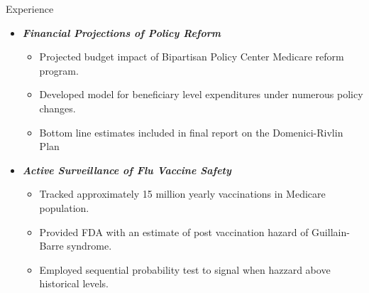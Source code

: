 \documentclass{resume} %
\begin{document}
\begin{rSection}{Experience}
\begin{itemize}
\begin{itemize}
\begin{itemize}
    	\end{itemize}
    	\item {\bf \em Financial Projections of Policy Reform}
        \begin{itemize} \itemsep -0.2em
    		\item Projected budget impact of Bipartisan Policy Center Medicare reform program.
            \item Developed model for beneficiary level expenditures under numerous policy changes.
            \item Bottom line estimates included in final report on the Domenici-Rivlin Plan
    	\end{itemize}
        \item {\bf \em Active Surveillance of Flu Vaccine Safety}
        \begin{itemize} \itemsep -0.2em
        	\item Tracked approximately 15 million yearly vaccinations in Medicare population.
        	\item Provided FDA with an estimate of post vaccination hazard of Guillain-Barre syndrome.
            \item Employed sequential probability test to signal when hazzard above historical levels.
        \end{itemize}
    \end{itemize}
\end{itemize}


\end{rSection}
\end{document}
